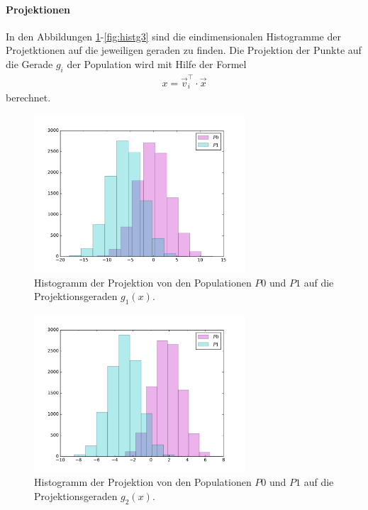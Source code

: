 \paragraph{Projektionen}
In den Abbildungen \ref{fig:histg1}-\ref{fig:histg3} sind
die eindimensionalen Histogramme der Projetktionen
auf die jeweiligen
geraden zu  finden.
Die Projektion der Punkte auf die Gerade $g_i$ der Population wird mit Hilfe
der Formel
\begin{align}
  x=\vec v_i^\top \cdot \vec x
\end{align}
berechnet.

\begin{figure}
  \centering
  \includegraphics[width=0.7\textwidth]{g_1.pdf}
  \caption{Histogramm der Projektion
   von den Populationen $P0$ und $P1$ auf die Projektionsgeraden $g_1(x)$.}
  \label{fig:histg1}
\end{figure}


\begin{figure}
  \centering
  \includegraphics[width=0.7\textwidth]{g_2.pdf}
  \caption{Histogramm der Projektion
   von den Populationen $P0$ und $P1$ auf die Projektionsgeraden $g_2(x)$.}
  \label{fig:histg2}
\end{figure}


